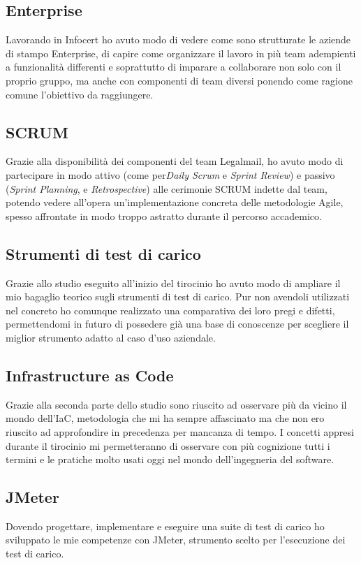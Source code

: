 \subsection{Enterprise}
Lavorando in Infocert ho avuto modo di vedere come sono strutturate le aziende di stampo Enterprise, di capire come organizzare il lavoro in più team adempienti a funzionalità differenti e soprattutto di imparare a collaborare non solo con il proprio gruppo, ma anche con componenti di team diversi ponendo come ragione comune l'obiettivo da raggiungere.
\subsection{SCRUM}
Grazie alla disponibilità dei componenti del team Legalmail, ho avuto modo di partecipare in modo attivo (come per\textit{Daily Scrum} e \textit{Sprint Review}) e passivo (\textit{Sprint Planning}, e \textit{Retrospective}) alle cerimonie SCRUM indette dal team, potendo vedere all'opera un'implementazione concreta delle metodologie Agile, spesso affrontate in modo troppo astratto durante il percorso accademico.
\subsection{Strumenti di test di carico}
Grazie allo studio eseguito all'inizio del tirocinio ho avuto modo di ampliare il mio bagaglio teorico sugli strumenti di test di carico. Pur non avendoli utilizzati nel concreto ho comunque realizzato una comparativa dei loro pregi e difetti, permettendomi in futuro di possedere già una base di conoscenze per scegliere il miglior strumento adatto al caso d'uso aziendale.
\subsection{Infrastructure as Code}
Grazie alla seconda parte dello studio sono riuscito ad osservare più da vicino il mondo dell'IaC, metodologia che mi ha sempre affascinato ma che non ero riuscito ad approfondire in precedenza per mancanza di tempo. I concetti appresi durante il tirocinio mi permetteranno di osservare con più cognizione tutti i termini e le pratiche molto usati oggi nel mondo dell'ingegneria del software. 
\subsection{JMeter}
Dovendo progettare, implementare e eseguire una suite di test di carico ho sviluppato le mie competenze con JMeter, strumento scelto per l'esecuzione dei test di carico.
